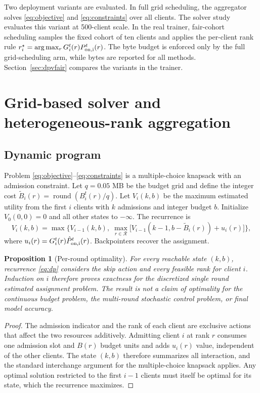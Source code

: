 \documentclass[preprint,12pt]{elsarticle}
\newtheorem{proposition}{Proposition}
\begin{document}
Two deployment variants are evaluated. In full grid scheduling, the aggregator solves \eqref{eq:objective} and \eqref{eq:constraints} over all clients. The solver study evaluates this variant at 500-client scale. In the real trainer, fair-cohort scheduling samples the fixed cohort of ten clients and applies the per-client rank rule $r_i^\star=\arg\max_r G_i^t(r)P_{\rm on,i}^t(r)$. The byte budget is enforced only by the full grid-scheduling arm, while bytes are reported for all methods. Section~\ref{sec:dpvfair} compares the variants in the trainer.

\section{Grid-based solver and heterogeneous-rank aggregation}
\label{sec:solver}

\subsection{Dynamic program}
Problem \eqref{eq:objective}--\eqref{eq:constraints} is a multiple-choice knapsack with an admission constraint. Let $q=0.05$ MB be the budget grid and define the integer cost $\widetilde B_i(r)=\operatorname{round}(B_i^t(r)/q)$. Let $V_i(k,b)$ be the maximum estimated utility from the first $i$ clients with $k$ admissions and integer budget $b$. Initialize $V_0(0,0)=0$ and all other states to $-\infty$. The recurrence is
\begin{equation}
V_i(k,b)=\max\Big\{V_{i-1}(k,b),\;\max_{r\in\mathcal R}\big[V_{i-1}(k-1,b-\widetilde B_i(r))+u_i(r)\big]\Big\},
\label{eq:dp}
\end{equation}
where $u_i(r)=G_i^t(r)\hat P_{\rm on,i}^t(r)$. Backpointers recover the assignment.

\begin{proposition}[Per-round optimality]
For every reachable state $(k,b)$, recurrence \eqref{eq:dp} considers the skip action and every feasible rank for client $i$. Induction on $i$ therefore proves exactness for the discretized single round estimated assignment problem. The result is not a claim of optimality for the continuous budget problem, the multi-round stochastic control problem, or final model accuracy.
\end{proposition}
\begin{proof}
The admission indicator and the rank of each client are exclusive actions that affect the two resources additively. Admitting client $i$ at rank $r$ consumes one admission slot and $B(r)$ budget units and adds $u_i(r)$ value, independent of the other clients. The state $(k,b)$ therefore summarizes all interaction, and the standard interchange argument for the multiple-choice knapsack applies. Any optimal solution restricted to the first $i-1$ clients must itself be optimal for its state, which the recurrence maximizes.
\end{proof}
\end{document}
